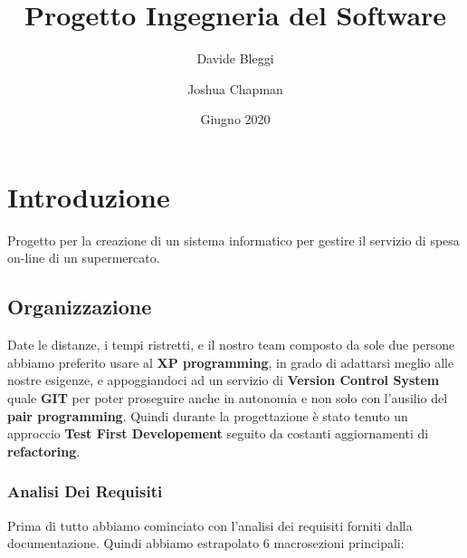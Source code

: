 \documentclass[12pt, a4paper]{report}
\title{Progetto Ingegneria del Software}
\author{Davide Bleggi \and Joshua Chapman}
\date{Giugno 2020}
\begin{document}
\begin{titlepage}
  \maketitle
\end{titlepage}

\tableofcontents
\newpage


\chapter{Introduzione}

Progetto per la creazione di un sistema informatico per gestire il servizio di
spesa on-line di un supermercato.

\section{Organizzazione}
Date le distanze, i tempi ristretti, e il nostro team composto da sole due 
persone abbiamo preferito usare al \textbf{XP programming}, in grado di adattarsi meglio
alle nostre esigenze, e appoggiandoci ad un servizio di \textbf{Version Control System}
quale \textbf{GIT} per poter proseguire anche in autonomia e non solo con 
l'ausilio del \textbf{pair programming}. Quindi durante la progettazione è stato
tenuto un approccio \textbf{Test First Developement} seguito da costanti 
aggiornamenti di \textbf{refactoring}.

\subsection{Analisi Dei Requisiti}
Prima di tutto abbiamo cominciato con l'analisi dei requisiti forniti dalla 
documentazione. Quindi abbiamo estrapolato 6 macrosezioni principali:
\end{document}
